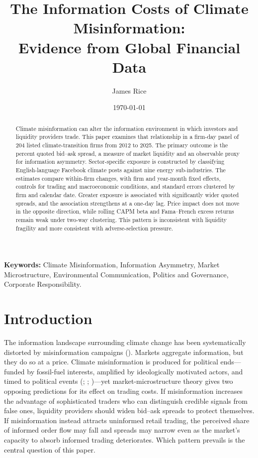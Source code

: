 \documentclass{article}
\title{The Information Costs of Climate Misinformation: \\\large Evidence from Global Financial Data}
\author[1]{James Rice}
\affil[1]{Department of Government, University of Essex}
\date{\today}
\theoremstyle{plain}
\begin{document}
\maketitle

\begin{abstract}

Climate misinformation can alter the information environment in which investors and liquidity providers trade. This paper examines that relationship in a firm-day panel of 204 listed climate-transition firms from 2012 to 2025. The primary outcome is the percent quoted bid--ask spread, a measure of market liquidity and an observable proxy for information asymmetry. Sector-specific exposure is constructed by classifying English-language Facebook climate posts against nine energy sub-industries. The estimates compare within-firm changes, with firm and year-month fixed effects, controls for trading and macroeconomic conditions, and standard errors clustered by firm and calendar date. Greater exposure is associated with significantly wider quoted spreads, and the association strengthens at a one-day lag. Price impact does not move in the opposite direction, while rolling CAPM beta and Fama--French excess returns remain weak under two-way clustering. This pattern is inconsistent with liquidity fragility and more consistent with adverse-selection pressure.
\end{abstract}

\noindent\textbf{Keywords:} Climate Misinformation, Information Asymmetry, Market Microstructure, Environmental Communication, Politics and Governance, Corporate Responsibility.

\section{Introduction}

The information landscape surrounding climate change has been systematically distorted by misinformation campaigns (\cite{cobb2025politics}). Markets aggregate information, but they do so at a price. Climate misinformation is produced for political ends---funded by fossil-fuel interests, amplified by ideologically motivated actors, and timed to political events (\cite{farrell2016network}; \cite{oreskes2010merchants}; \cite{cinelli2021echo})---yet market-microstructure theory gives two opposing predictions for its effect on trading costs. If misinformation increases the advantage of sophisticated traders who can distinguish credible signals from false ones, liquidity providers should widen bid--ask spreads to protect themselves. If misinformation instead attracts uninformed retail trading, the perceived share of informed order flow may fall and spreads may narrow even as the market's capacity to absorb informed trading deteriorates. Which pattern prevails is the central question of this paper.
\end{document}
